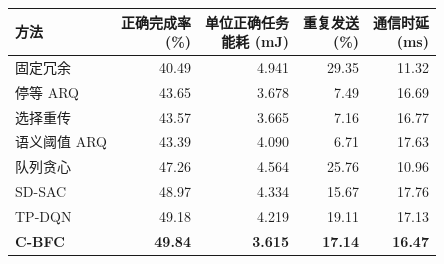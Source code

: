 \begin{table}[t]
  \centering\small
  \setlength{\tabcolsep}{3.5pt}
  \label{rq3:tab:main-results}
  \begin{tabular*}{\linewidth}{@{\extracolsep{\fill}}lrrrr@{}}
    \toprule
    方法 & \shortstack{正确完成率\\(\%)} & \shortstack{单位正确任务\\能耗 (mJ)} & \shortstack{重复发送\\(\%)} & \shortstack{通信时延\\(ms)}\\
    \midrule
    固定冗余 & 40.49 & 4.941 & 29.35 & 11.32\\
    停等 ARQ & 43.65 & 3.678 & 7.49 & 16.69\\
    选择重传 & 43.57 & 3.665 & 7.16 & 16.77\\
    语义阈值 ARQ & 43.39 & 4.090 & 6.71 & 17.63\\
    队列贪心 & 47.26 & 4.564 & 25.76 & 10.96\\
    SD-SAC & 48.97 & 4.334 & 15.67 & 17.76\\
    TP-DQN & 49.18 & 4.219 & 19.11 & 17.13\\
    \midrule
    \textbf{C-BFC} & \textbf{49.84} & \textbf{3.615} & \textbf{17.14} & \textbf{16.47}\\
    \bottomrule
  \end{tabular*}
  \par\vspace{4pt}{\footnotesize 各条件等权汇总，共享的参考条件只计入一次。加粗行表示本章方法。}
\end{table}
